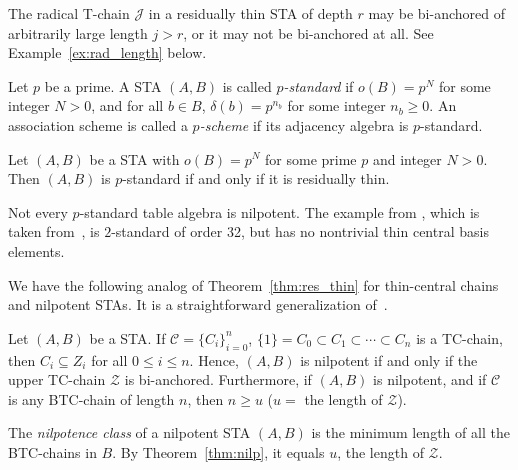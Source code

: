 \documentclass[ALCO,ThmDefs,Unicode,epreuves]{cedram}
\begin{document}
\begin{rema}
\label{rem:res_v_rad}
The radical T-chain $\mathcal{J}$ in a residually thin STA of depth $r$
may be bi-anchored of arbitrarily large length $j > r$, or it may not be
bi-anchored at all. See Example~\ref{ex:rad_length} below.
\end{rema}

\begin{defi}
\label{def_p-standard}
\cite [Definition~1.4]{BC} Let $p$ be a prime. A STA $(A, B)$ is called
\emph{$p$-standard} if $o(B) = p^N$ for some integer $N > 0$, and for
all $b \in B$, $\delta(b) = p^{n_b}$ for some integer $n_b \geq 0$. An
association scheme is called a \emph{$p$-scheme} if its adjacency
algebra is $p$-standard.
\end{defi}

\begin{prop}
\label{prop:p-stan_res_thin}
Let $(A, B)$ be a STA with $o(B) = p^N$ for some prime $p$ and integer
$N > 0$. Then $(A, B)$ is $p$-standard if and only if it is residually
thin.
\end{prop}

\begin{rema}
\label{rem:p-standard}
Not every $p$-standard table algebra is nilpotent. The example from
\cite [Remark~1.4]{BC}, which is taken from~\cite [No.10851]{HM}, is
$2$-standard of order 32, but has no nontrivial thin central basis elements.
\end{rema} 
 
We have the following analog of Theorem~\ref{thm:res_thin} for
thin-central chains and nilpotent STAs. It is a straightforward
generalization of~\cite [Theorem~2.5]{H}. 

\begin{thm}
\label{thm:nilp}
Let $(A, B)$ be a STA. If $\mathcal{C} = \{C_i\}_{i=0}^n$, $\{1\} = C_0
\subset C_1 \subset \cdots \subset C_n$ is a TC-chain, then $C_i
\subseteq Z_i$ for all $0 \leq i \leq n$. Hence, $(A, B)$ is nilpotent
if and only if the upper TC-chain $\mathcal{Z}$ is bi-anchored.
Furthermore, if $(A, B)$ is nilpotent, and if $\mathcal{C}$ is any
BTC-chain of length $n$, then $n \geq u$ \textup{(}$u =$ the length of
$\mathcal{Z}$\textup{)}.
\end{thm}

\begin{defi}
\label{def:class} 
The \emph{nilpotence class} of a nilpotent STA $(A, B)$ is the minimum
length of all the BTC-chains in $B$. By Theorem~\ref{thm:nilp}, it
equals $u$, the length of $\mathcal{Z}$.
\end{defi} 
\end{document}
